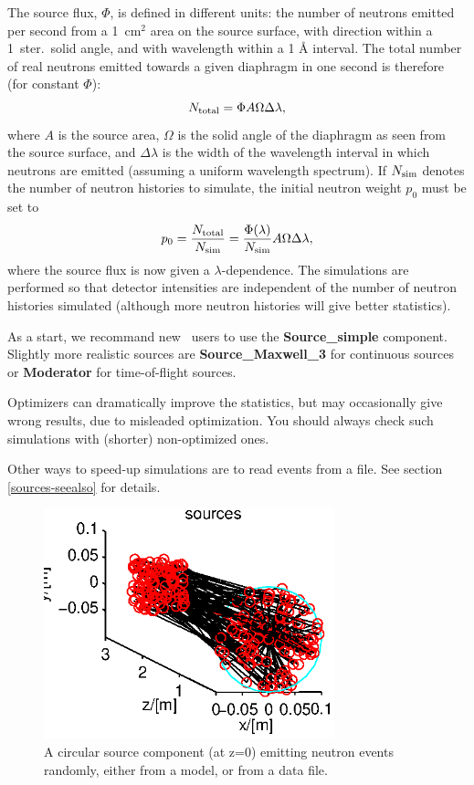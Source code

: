 The source flux, $\Phi$, is defined in different units:
the number of neutrons emitted per second from a
1~cm$^2$ area on the source surface,
with direction within a 1~ster.\ solid angle,
and with wavelength within a 1 {\AA} interval.
The total number of real neutrons emitted towards a given diaphragm
in one second is therefore (for constant $\Phi$):
\begin{equation}
N_{\rm total} = \Phi A \Omega \Delta\lambda ,
\end{equation}
where $A$ is the source area, $\Omega$ is the solid angle of the
diaphragm as seen from the source surface, and $\Delta\lambda$ is the
width of the wavelength interval in which neutrons are emitted (assuming
a uniform wavelength spectrum). If $N_{\rm sim}$ denotes the number of
neutron histories to simulate, the initial neutron weight $p_0$ must be set to
\begin{equation}
p_0 = \frac{N_{\rm total}}{N_{\rm sim}} =
    \frac{\Phi(\lambda)}{N_{\rm sim}} A \Omega \Delta\lambda ,
\end{equation}
where the source flux is now given a $\lambda$-dependence.
The simulations are performed so that detector intensities
are independent of the number of neutron histories simulated
(although more neutron histories will give better statistics).

As a start, we recommand new \MCS\ users to use the
{\bf Source\_simple} component.
Slightly more realistic sources are {\bf Source\_Maxwell\_3} for
continuous sources or {\bf Moderator} for time-of-flight sources.

Optimizers can dramatically improve the statistics, but may occasionally
give wrong results, due to misleaded optimization.
You should always check such simulations with (shorter) non-optimized ones.

Other ways to speed-up simulations are to read events from a file.
See section \ref{sources-seealso} for details.

\begin{figure}
  \begin{center}
    \includegraphics[width=0.75\textwidth]{figures/sources.eps}
  \end{center}
\caption{A circular source component (at z=0) emitting neutron events randomly, either from a model, or from a data file.}
\label{f:source}
\end{figure}

